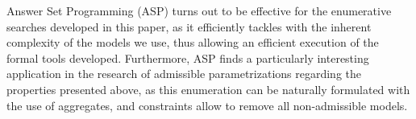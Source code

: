 Answer Set Programming (ASP) \cite{Baral03} turns out to be effective for the enumerative searches developed in this paper,
as it efficiently tackles with the inherent complexity of the models we use, thus allowing an efficient execution of the formal tools developed. %
Furthermore, ASP finds a particularly interesting application in the research of admissible parametrizations regarding the properties presented above, as this enumeration can be naturally formulated with the use of aggregates, and constraints allow to remove all non-admissible models.



\begin{comment}
\subsection{Answer Set Programming implementation concepts}

\newcommand{\ti}[1]{\texttt{\textit{#1}}}
\newcommand{\aspil}[1]{\texttt{#1}}
\newcommand{\asp}[1]{\begin{itemize} \item[] \aspil{#1} \end{itemize}}


All information describing the studied model (PH and inferred IG \& parameters) can be expressed in ASP using facts.
For functional purposes, we assign a unique label to each couple $A,B$ of activators and inhibitors of a given component, which allows to refer to the related parameter (in the following, we note $K^p_{a,A,B}$ the parameter of component $a$ whose regulators $A,B$ are assigned to the label $p$).
Consequently, to express that it exists a parameter of component \ti{a} with the label \ti{p}, we use an atom named \aspil{param\_label} in the following fact:
\asp{param\_label(\ti{a}, \ti{p}).}

Defining a set in ASP is equivalent to defining the rule for belonging to this set. For example, we can define an atom \aspil{param\_act} that describes the set of all active regulators for a parameter of component \ti{a} and label \ti{p} (\ie the set $A$ of a parameter $K^\ti{p}_{\ti{a},A,B}$). For example, describing the activators of $K^\ti{p}_{\ti{a},\{\ti{b},\ti{c}\},\{\ti{d}\}}$ gives:
\asp{param\_act(\ti{a}, \ti{p}, \ti{b}).
\item[] param\_act(\ti{a}, \ti{p}, \ti{c}).}
The absence of such a fact involving \ti{d} with label \ti{p} indicates that \ti{d} is an inhibitor in the configuration of regulators related to this parameter.


\end{comment}

